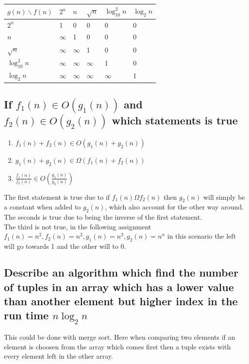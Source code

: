 \documentclass[12pt, a4paper]{article}
\begin{document}
				\begin{table}[h!]
					\begin{tabular}{|l|l|l|l|l|l|}
					\hline
					$g(n)\backslash f(n)$     & $2^n$    & $n$      & $\sqrt{n}$ & $\log_{10}^2n$ & $\log_2n$ \\ \hline
					$2^n$          & 1        & 0        & 0          & 0              & 0         \\ \hline
					$n$            & $\infty$ & 1        & 0          & 0              & 0         \\ \hline
					$\sqrt{n}$     & $\infty$ & $\infty$ & 1          & 0              & 0         \\ \hline
					$\log_{10}^2n$ & $\infty$ & $\infty$ & $\infty$   & 1              & 0         \\ \hline
					$\log_2n$      & $\infty$ & $\infty$ & $\infty$   & $\infty$       & 1         \\ \hline
					\end{tabular}
				\end{table}
			\subsection{If $f_1(n)\in O(g_1(n))$ and $f_2(n)\in O(g_2(n))$ which statements is true}
				\begin{enumerate}
					\item $f_1(n)+f_2(n)\in O(g_1(n)+g_2(n))$
					\item $g_1(n)+g_2(n)\in \Omega (f_1(n)+f_2(n))$
					\item $\frac{f_1(n)}{f_2(n)}\in O(\frac{g_1(n)}{g_2(n)})$
				\end{enumerate}
				The first statement is true due to if $f_1(n)\Omega f_2(n)$ then $g_2(n)$ will simply be a constant when added to $g_2(n)$, which also account for the other way around.\\
				The seconds is true due to being the inverse of the first statement.\\
				The third is not true, in the following assignment $f_1(n)=n^2, f_2(n)=n^2,g_1(n)=n^2,g_2(n)=n^n$ in this scenario the left will go towards 1 and the other will to 0.
			\subsection{Describe an algorithm which find the number of tuples in an array which has a lower value than another element but higher index in the run time $n\log_2n$}
				This could be done with merge sort. Here when comparing two elements if an element is choosen from the array which comes first then a tuple exists with every element left in the other array.
\end{document}
